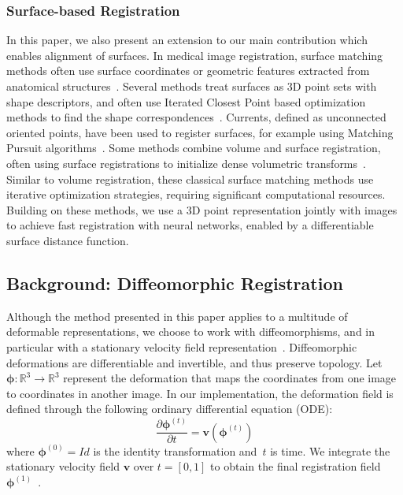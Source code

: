 \documentclass{article}
\newcommand{\bphi}{\boldsymbol{\phi}}
\newcommand{\bv}{\boldsymbol{v}}
\newcommand{\citep}{\cite}
\begin{document}
{\color{blue}
\subsubsection{\color{blue}Surface-based Registration}
	In this paper, we also present an extension to our main contribution which enables alignment of surfaces. In medical image registration, surface matching methods often use surface coordinates or geometric features extracted from anatomical structures~\citep{aiger2008,durrleman2010,miga2003,postelnicu2008}. Several methods treat surfaces as 3D point sets with shape descriptors, and often use Iterated Closest Point based optimization methods to find the shape correspondences~\citep{besl1992method}. Currents, defined as unconnected oriented points, have been used to register surfaces, for example using Matching Pursuit algorithms~\cite{durrleman2010}. Some methods combine volume and surface registration, often using surface registrations to initialize dense volumetric transforms~\cite{postelnicu2008}. Similar to volume registration, these classical surface matching methods use iterative optimization strategies, requiring significant computational resources. Building on these methods, we use a 3D point representation jointly with images to achieve fast registration with neural networks, enabled by a differentiable surface distance function.}





\subsection{Background: Diffeomorphic Registration}

Although the method presented in this paper applies to a multitude of deformable representations, we choose to work with diffeomorphisms, and in particular with a stationary velocity field representation~\citep{ashburner2007}.  Diffeomorphic deformations are differentiable and invertible, and thus preserve topology. Let~\mbox{$\bphi: \mathbb{R}^3 \rightarrow \mathbb{R}^3$} represent the deformation that maps the coordinates from one image to coordinates in another image. In our implementation,  the deformation field is defined through the following ordinary differential equation (ODE): 
\begin{equation}
\frac{\partial\bphi^{(t)}}{\partial t} = \bv(\bphi^{(t)})
\label{eq:ode}
\end{equation}
where $\bphi^{(0)} = Id$ is the identity transformation and~$t$ is time. We integrate  the stationary velocity field $\bv$ over $t=[0,1]$ to obtain the final registration field $\bphi^{(1)}$~\citep{moler2003}. 
\end{document}
